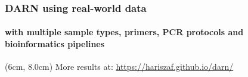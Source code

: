 \documentclass{beamer}
\begin{document}
   \begin{frame}
      \frametitle{DARN using real-world data}
      \framesubtitle{with multiple sample types, primers, PCR protocols and bioinformatics pipelines}


      \begin{textblock*}{6cm}(6cm, 8.0cm)
         \footnotesize
         More results at:
         \href{https://hariszaf.github.io/darn/}{https://hariszaf.github.io/darn/} 
      \end{textblock*}


\end{frame}
\end{document}
